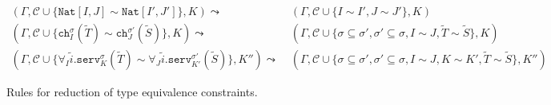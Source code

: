 \begin{table*}[!ht]
    \begin{framed}\vspace{-1em}\begin{align*}
        (\Gamma,\mathcal{C} \cup \{\texttt{Nat}[I,J] \sim \texttt{Nat}[I',J']\},K) \leadsto&\; (\Gamma,\mathcal{C} \cup \{ I \sim I', J \sim J' \},K)\\
        (\Gamma,\mathcal{C} \cup \{\texttt{ch}^\sigma_I(\widetilde{T}) \sim \texttt{ch}^{\sigma'}_J(\widetilde{S})\},K) \leadsto&\; (\Gamma,\mathcal{C} \cup \{ \sigma \subseteq \sigma', \sigma' \subseteq \sigma, I \sim J, \widetilde{T} \sim \widetilde{S} \},K)\\
        (\Gamma,\mathcal{C} \cup \{\forall_I\widetilde{i}.\texttt{serv}^\sigma_K(\widetilde{T}) \sim \forall_J\widetilde{i}.\texttt{serv}^{\sigma'}_{K'}(\widetilde{S})\},K'') \leadsto&\; (\Gamma,\mathcal{C} \cup \{ \sigma \subseteq \sigma', \sigma' \subseteq \sigma, I \sim J, K \sim K', \widetilde{T} \sim \widetilde{S} \},K'')
    \end{align*}\vspace{-1em}\end{framed}
    \smallskip
    \caption{Rules for reduction of type equivalence constraints.}
    \label{tab:inferencerulessim}
\end{table*}
